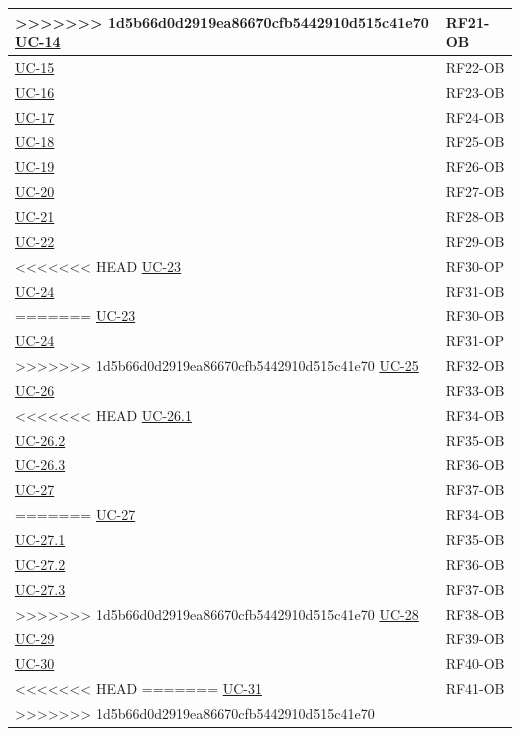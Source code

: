 ﻿\documentclass[a4paper,12pt]{article}
\begin{document}
\begin{description}[style=multiline, leftmargin=4cm, font=\bfseries]
\begin{enumerate}[leftmargin=*, nosep]
{\begin{longtable}{|p{4cm}|p{4cm}|}
>>>>>>> 1d5b66d0d2919ea86670cfb5442910d515c41e70
    \hline
    \hyperref[fig:uc-14]{UC-14} & RF21-OB \\
    \hline
    \hyperref[fig:uc-15]{UC-15} & RF22-OB \\
    \hline
    \hyperref[fig:uc-16]{UC-16} & RF23-OB \\
    \hline
    \hyperref[fig:uc-17]{UC-17} & RF24-OB \\
    \hline
    \hyperref[fig:uc-18]{UC-18} & RF25-OB \\
    \hline
    \hyperref[fig:uc-19]{UC-19} & RF26-OB \\
    \hline
    \hyperref[fig:uc-20]{UC-20} & RF27-OB \\
    \hline
    \hyperref[fig:uc-21]{UC-21} & RF28-OB \\
    \hline
    \hyperref[fig:uc-22]{UC-22} & RF29-OB \\
    \hline
<<<<<<< HEAD
    \hyperref[fig:uc-23]{UC-23} & RF30-OP \\
    \hline
    \hyperref[fig:uc-24]{UC-24} & RF31-OB \\
=======
    \hyperref[fig:uc-23]{UC-23} & RF30-OB \\
    \hline
    \hyperref[fig:uc-24]{UC-24} & RF31-OP \\
>>>>>>> 1d5b66d0d2919ea86670cfb5442910d515c41e70
    \hline
    \hyperref[fig:uc-25]{UC-25} & RF32-OB \\
    \hline
    \hyperref[fig:uc-26]{UC-26} & RF33-OB \\
    \hline
<<<<<<< HEAD
    \hyperref[fig:uc-26.1]{UC-26.1} & RF34-OB \\
    \hline
    \hyperref[fig:uc-26.2]{UC-26.2} & RF35-OB \\
    \hline
    \hyperref[fig:uc-26.3]{UC-26.3} & RF36-OB \\
    \hline
    \hyperref[fig:uc-27]{UC-27} & RF37-OB \\
=======
    \hyperref[fig:uc-27]{UC-27} & RF34-OB \\
    \hline
    \hyperref[fig:uc-27.1]{UC-27.1} & RF35-OB \\
    \hline
    \hyperref[fig:uc-27.2]{UC-27.2} & RF36-OB \\
    \hline
    \hyperref[fig:uc-27.3]{UC-27.3} & RF37-OB \\
>>>>>>> 1d5b66d0d2919ea86670cfb5442910d515c41e70
    \hline
    \hyperref[fig:uc-28]{UC-28} & RF38-OB \\
    \hline
    \hyperref[fig:uc-29]{UC-29} & RF39-OB \\
    \hline
    \hyperref[fig:uc-30]{UC-30} & RF40-OB \\
<<<<<<< HEAD
=======
    \hline
    \hyperref[fig:uc-31]{UC-31} & RF41-OB \\
>>>>>>> 1d5b66d0d2919ea86670cfb5442910d515c41e70
    \hline


\end{longtable}}
\end{enumerate}
\end{description}
\end{document}
